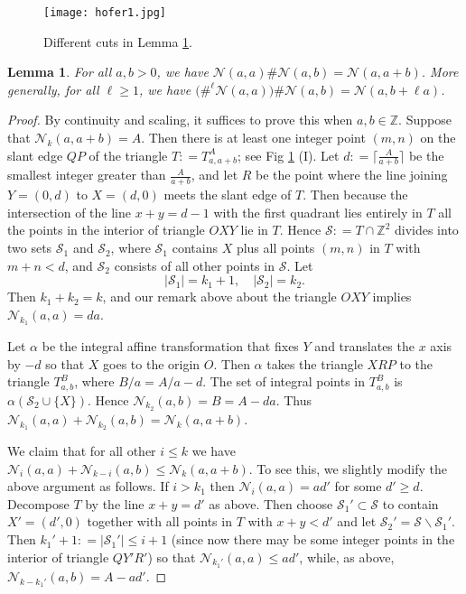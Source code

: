 \documentclass[11pt]{amsart}
\newcommand{\labell}[1] {\label{#1}}
\newcommand{\1}{{{\mathchoice {\rm 1\mskip-4mu l} {\rm 1\mskip-4mu l}
{\rm 1\mskip-4.5mu l} {\rm 1\mskip-5mu l}}}}
\newcommand{\less}{{\smallsetminus}}
\newcommand{\al}{{\alpha}}
\newcommand{\Ss}{{\mathcal S}}
\newcommand{\Z}{{\mathbb Z}}
\newcommand{\Nn}{{\mathcal N}}
\newtheorem{lemma}[theorem]{Lemma}
\numberwithin{figure}{section}
\numberwithin{equation}{section}
\begin{document}
  
 \begin{figure}[htbp] %
    \centering
    \texttt{[image: hofer1.jpg]} 
    \caption{Different cuts in Lemma \ref{le:hof1}.}
    \labell{fig:1}
 \end{figure}
\begin{lemma}\labell{le:hof1} For all $a,b> 0$, we have $\Nn(a,a) \#\Nn(a,b) =  \Nn(a,a+b)$.
More generally, for all $\ell\ge 1$, we have 
$\bigl(\#^\ell \Nn(a,a) \bigr)\#\Nn(a,b) =  \Nn(a,b + \ell a)$.
\end{lemma}
\begin{proof}  By continuity and scaling, it suffices to prove this when $a,b\in \Z$.  Suppose that $\Nn_k(a,a+b) = A$.  Then there is at least one integer point $(m,n)$ on the slant edge $QP$ of the triangle $T: = T_{a,a+b}^A$; see Fig \ref{fig:1} (I). 
Let $d: = \lceil\frac A{a+b} \rceil$ be the smallest  integer greater than $\frac A{a+b}$, and 
let $R$ be the point where the line joining $Y=(0,d)$ to $X=(d,0)$ meets the slant edge of $T$.  Then because the intersection of the line $x+y=d-1$ with the first quadrant
lies entirely in $T$ all the points in the interior of triangle $OXY$ lie in $T$.  Hence 
$\Ss: = T\cap \Z^2$ divides into two sets $\Ss_1$ and $\Ss_2$, where $\Ss_1$ contains $X$ plus all points $(m,n)$ in $T$ with 
$m+n<d$, %
and $\Ss_2$ consists of all other points in $\Ss$.  
Let 
$$
|\Ss_1|= k_1+1,\quad |\Ss_2|= k_2.
$$
Then $k_1+k_2=k$, and our remark above about the triangle $OXY$ implies
$\Nn_{k_1}(a,a) = da$.

Let $\al$ be   the  integral affine transformation that fixes $Y$  and translates the $x$ axis by $-d$ so that  $X$ goes  to the origin $O$. Then $\al$ takes the
 triangle $XRP$ to the triangle $T_{a,b}^B$, where $B/a = A/a - d$.
 The set of integral points in $T_{a,b}^B$ is $\al(\Ss_2\cup \{X\})$.
 Hence $\Nn_{k_2}(a,b)= B=A-da$.
 Thus  $\Nn_{k_1} (a,a) + \Nn_{k_2}(a,b) = \Nn_k(a,a+b)$.
 
 We claim that for all other $i\le k$ we have $\Nn_{i} (a,a) + \Nn_{k-i}(a,b) \le \Nn_k(a,a+b)$.
To see this, we slightly modify the above argument as follows.  
If $i> k_1$ then $\Nn_i(a,a) = ad'$ for some $d'\ge d$.    
Decompose $T$ by the line $x+y=d'$ as above. Then  choose  $\Ss_1'\subset \Ss$ to contain $X'=(d',0)$ together with all points in $T$ with $x+y<d'$
and let $\Ss_2'= \Ss\less \Ss_1'$.  Then $k_1'+1: =|\Ss_1'| \le i+1$  (since now there may be some
integer  points in the interior of triangle $QY'R'$) so that $\Nn_{k_1'}(a,a) \le ad'$, while, as above, $\Nn_{k-k_1'}(a,b)= A-ad'$.   


\end{proof}
\end{document}
